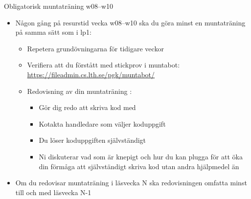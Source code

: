 %
%
%

\begin{Slide}{Obligatorisk muntaträning w08--w10}
\begin{itemize}
  \item Någon gång på resurstid vecka w08--w10 ska du göra minst en muntaträning på samma sätt som i lp1:
  \begin{itemize}
\item Repetera grundövningarna för tidigare veckor
\item Verifiera att du förstått med stickprov i muntabot: \\\url{https://fileadmin.cs.lth.se/pgk/muntabot/}
\item Redovisning av din muntaträning :
\begin{itemize}
\item Gör dig redo att skriva kod med 
\item Kotakta handledare som väljer koduppgift
\item Du löser koduppgiften självständigt
\item Ni diskuterar vad som är knepigt och hur du kan plugga för att öka din förmåga att självständigt skriva kod utan andra hjälpmedel än 
\end{itemize}
\end{itemize}
  \item Om du redovisar muntaträning i läsvecka N ska redovisningen omfatta minst till och med läsvecka N-1
\end{itemize}
\end{Slide} 


